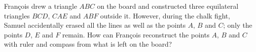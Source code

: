 François drew a triangle $ABC$ on the board and constructed three equilateral triangles $BCD$, $CAE$ and $ABF$ outside it. However, during the chalk fight, Samuel accidentally erased all the lines as well as the points $A$, $B$ and $C$; only the points $D$, $E$ and $F$ remain. How can François reconstruct the points $A$, $B$ and $C$ with ruler and compass from what is left on the board?
